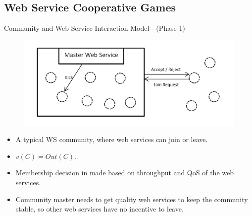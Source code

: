 \documentclass{beamer}
\begin{document}
\subsection{Web Service Cooperative Games}

\begin{frame}{Community and Web Service Interaction Model - (Phase 1)}
    \begin{figure}[htbp]
        \centering
        \includegraphics[width=0.8 \columnwidth]{figures/scenario1.png}
    \end{figure}

    \begin{itemize}
        \item A typical WS community, where web services can join or leave.
        \item $v(C) = Out(C)$.
        \item Membership decision in made based on throughput and QoS of the web services.
        \item Community master needs to get quality web services to keep the community stable, so other web services have no incentive to leave.
    \end{itemize}
       	
\end{frame}
\end{document}
